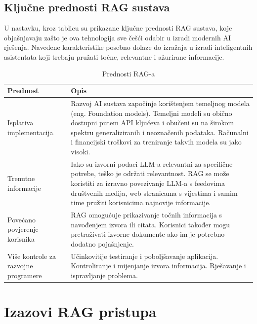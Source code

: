\documentclass[]{foi}
\begin{document}
\subsection{Ključne prednosti RAG sustava}
U nastavku, kroz tablicu su prikazane ključne prednosti RAG sustava, koje objašnjavaju zašto je ova tehnologija sve češći odabir u izradi modernih AI rješenja. Navedene karakteristike
posebno dolaze do izražaja u izradi inteligentnih asistentata koji trebaju pružati točne, relevantne i ažurirane informacije. 

\begin{table}[ht!]
    \centering
    \caption{Prednosti RAG-a \cite{awsRAG2025}}
    \begin{tabular}{|>{\centering\arraybackslash}m{5cm}|>{\raggedright\arraybackslash}m{10cm}|}
      \hline
      \textbf{Prednost} & \textbf{Opis} \\
      \hline
      Isplativa implementacija & Razvoj AI sustava započinje korištenjem temeljnog modela (eng. Foundation models). Temeljni modeli su obično dostupni putem API ključeva i obučeni su na širokom spektru generaliziranih i neoznačenih podataka. Računalni i financijski troškovi za treniranje takvih modela su jako visoki. \\
      \hline
      Trenutne informacije & Iako su izvorni podaci LLM-a relevantni za specifične potrebe, teško je održati relevantnost. RAG se može koristiti za izravno povezivanje LLM-a s feedovima društvenih medija, web stranicama s vijestima i samim time pružiti korisnicima najnovije informacije. \\
      \hline
      Povećano povjerenje korisnika & RAG omogućuje prikazivanje točnih informacija s navođenjem izvora ili citata. Korisnici također mogu pretraživati izvorne dokumente ako im je potrebno dodatno pojašnjenje. \\
      \hline
      Više kontrole za razvojne programere & Učinkovitije testiranje i poboljšavanje aplikacija. Kontroliranje i mijenjanje izvora informacija. Rješavanje i ispravljanje problema. \\
      \hline
    \end{tabular}
\end{table}
    




\section{Izazovi RAG pristupa}
\end{document}
